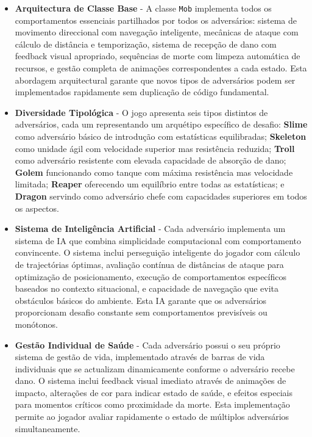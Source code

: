\begin{itemize}
  \item \textbf{Arquitectura de Classe Base} - A classe \texttt{Mob} implementa todos os comportamentos essenciais partilhados por todos os adversários: sistema de movimento direccional com navegação inteligente, mecânicas de ataque com cálculo de distância e temporização, sistema de recepção de dano com feedback visual apropriado, sequências de morte com limpeza automática de recursos, e gestão completa de animações correspondentes a cada estado. Esta abordagem arquitectural garante que novos tipos de adversários podem ser implementados rapidamente sem duplicação de código fundamental.
  
  \item \textbf{Diversidade Tipológica} - O jogo apresenta seis tipos distintos de adversários, cada um representando um arquétipo específico de desafio: \textbf{Slime} como adversário básico de introdução com estatísticas equilibradas; \textbf{Skeleton} como unidade ágil com velocidade superior mas resistência reduzida; \textbf{Troll} como adversário resistente com elevada capacidade de absorção de dano; \textbf{Golem} funcionando como tanque com máxima resistência mas velocidade limitada; \textbf{Reaper} oferecendo um equilíbrio entre todas as estatísticas; e \textbf{Dragon} servindo como adversário chefe com capacidades superiores em todos os aspectos.
  
  \item \textbf{Sistema de Inteligência Artificial} - Cada adversário implementa um sistema de IA que combina simplicidade computacional com comportamento convincente. O sistema inclui perseguição inteligente do jogador com cálculo de trajectórias óptimas, avaliação contínua de distâncias de ataque para optimização de posicionamento, execução de comportamentos específicos baseados no contexto situacional, e capacidade de navegação que evita obstáculos básicos do ambiente. Esta IA garante que os adversários proporcionam desafio constante sem comportamentos previsíveis ou monótonos.
  
  \item \textbf{Gestão Individual de Saúde} - Cada adversário possui o seu próprio sistema de gestão de vida, implementado através de barras de vida individuais que se actualizam dinamicamente conforme o adversário recebe dano. O sistema inclui feedback visual imediato através de animações de impacto, alterações de cor para indicar estado de saúde, e efeitos especiais para momentos críticos como proximidade da morte. Esta implementação permite ao jogador avaliar rapidamente o estado de múltiplos adversários simultaneamente.
  

\end{itemize}
